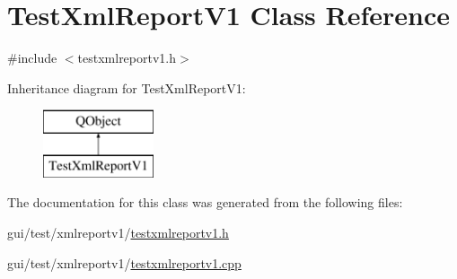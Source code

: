 \hypertarget{class_test_xml_report_v1}{\section{Test\-Xml\-Report\-V1 Class Reference}
\label{class_test_xml_report_v1}
}


{\ttfamily \#include $<$testxmlreportv1.\-h$>$}

Inheritance diagram for Test\-Xml\-Report\-V1\-:\begin{figure}[H]
\begin{center}
\leavevmode
\includegraphics[height=2.000000cm]{class_test_xml_report_v1}
\end{center}
\end{figure}


The documentation for this class was generated from the following files\-:\begin{DoxyCompactItemize}
\item 
gui/test/xmlreportv1/\hyperlink{testxmlreportv1_8h}{testxmlreportv1.\-h}\item 
gui/test/xmlreportv1/\hyperlink{testxmlreportv1_8cpp}{testxmlreportv1.\-cpp}\end{DoxyCompactItemize}
